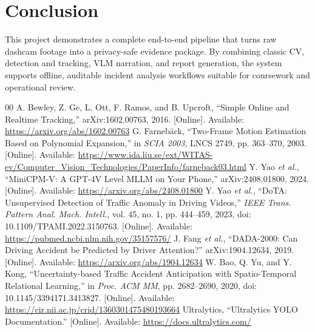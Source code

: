 \documentclass[conference]{IEEEtran}
\begin{document}
\section{Conclusion}
This project demonstrates a complete end-to-end pipeline that turns raw dashcam footage into a privacy-safe evidence package. By combining classic CV, detection and tracking, VLM narration, and report generation, the system supports offline, auditable incident analysis workflows suitable for coursework and operational review.

\begin{thebibliography}{00}
 A. Bewley, Z. Ge, L. Ott, F. Ramos, and B. Upcroft, ``Simple Online and Realtime Tracking,'' arXiv:1602.00763, 2016. [Online]. Available: \url{https://arxiv.org/abs/1602.00763}
 G. Farneb\"ack, ``Two-Frame Motion Estimation Based on Polynomial Expansion,'' in \textit{SCIA 2003}, LNCS 2749, pp. 363--370, 2003. [Online]. Available: \url{https://www.ida.liu.se/ext/WITAS-ev/Computer_Vision_Technologies/PaperInfo/farneback03.html}
 Y. Yao \textit{et al.}, ``MiniCPM-V: A GPT-4V Level MLLM on Your Phone,'' arXiv:2408.01800, 2024. [Online]. Available: \url{https://arxiv.org/abs/2408.01800}
 Y. Yao \textit{et al.}, ``DoTA: Unsupervised Detection of Traffic Anomaly in Driving Videos,'' \textit{IEEE Trans. Pattern Anal. Mach. Intell.}, vol. 45, no. 1, pp. 444--459, 2023, doi: 10.1109/TPAMI.2022.3150763. [Online]. Available: \url{https://pubmed.ncbi.nlm.nih.gov/35157576/}
 J. Fang \textit{et al.}, ``DADA-2000: Can Driving Accident be Predicted by Driver Attention?'' arXiv:1904.12634, 2019. [Online]. Available: \url{https://arxiv.org/abs/1904.12634}
 W. Bao, Q. Yu, and Y. Kong, ``Uncertainty-based Traffic Accident Anticipation with Spatio-Temporal Relational Learning,'' in \textit{Proc. ACM MM}, pp. 2682--2690, 2020, doi: 10.1145/3394171.3413827. [Online]. Available: \url{https://cir.nii.ac.jp/crid/1360301475480193664}
 Ultralytics, ``Ultralytics YOLO Documentation.'' [Online]. Available: \url{https://docs.ultralytics.com/}
\end{thebibliography}
\end{document}
